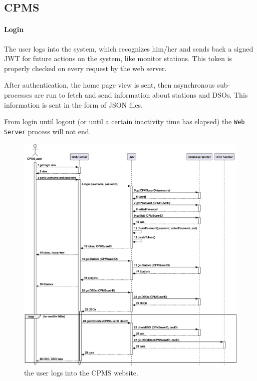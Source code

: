\vfill

\pagebreak

\subsection{CPMS}

\paragraph{Login} The user logs into the system, which recognizes him/her and sends back a signed JWT for future actions on the system, like monitor stations. This token is properly checked on every request by the web server. 

After authentication, the home page view is sent, then asynchronous sub-processes are run to fetch and send information about stations and DSOs. This information is sent in the form of JSON files.

From login until logout (or until a certain inactivity time has elapsed) the \texttt{Web Server} process will not end. 

\begin{figure}[h!]
    \centering
    \includegraphics[width=\columnwidth]{./images/sequences/cpms/login}
    \caption{the user logs into the CPMS website.}
\end{figure}


